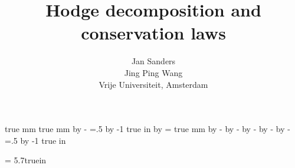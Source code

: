 \makeindex
\setcounter{secnumdepth}{7}
\setcounter{tocdepth}{7}



%
\newdimen\printercorrection
{} true mm
 true mm %
\advance\oddsidemargin by -\textwidth
\oddsidemargin=.5\oddsidemargin
\advance\oddsidemargin by -1 true in
\advance\oddsidemargin by \printercorrection
\evensidemargin=\oddsidemargin
{} true mm %
\advance\topmargin by -\textheight
\advance\topmargin by -\headheight
\advance\topmargin by -\headsep
\advance\topmargin by -\footheight
\advance\topmargin by -\footskip
\topmargin=.5\topmargin
\advance\topmargin by -1 true in
\newcommand{\lied}{\mbox{\eufm d}}
\newcommand{\lieg}{\mbox{\eufm g}}
\newcommand{\lief}{\mbox{\eufm f}}
\newcommand{\lieh}{\mbox{\eufm h}}
\newcommand{\lier}{\mbox{\eufm r}}
\newcommand{\lien}{\mbox{\eufm n}}
\newcommand{\R}{\mbox{\Bbb R}}
\newcommand{\liegl}{\mbox{\eufm gl}}
\def\operatorname#1{\mathop{\fam0 #1}\nolimits}
\def\Der{\operatorname{Der}}
\def\End{\operatorname{End}}
\def\Hom{\operatorname{Hom}}
\def\ad{\operatorname{ad}}
\def\im{\operatorname{Im}}
\def\ker{\operatorname{Ker}}
\def\id{\operatorname{Id}}
\def\d{\operatorname{d}}
\def\sym{\operatorname{Sym}}
\def\Cov{\operatorname{Cov}}
\def\Tr{\operatorname{Tr}}
\def\Str{\operatorname{Str}}
\def\Wedge{\hbox{\large$\wedge$}}
\def\cY{{{\cal Y}}}
\def\cT{{{\cal T}}}
\def\cZ{{{\cal Z}}}
\def\cL{{{\cal L}}}
\def\cC{{{\cal C}}}
\def\cD{{{\cal D}}}
\def\cS{{{\cal S}}}
\def\cCD{{{\cal C}\!D}}
\def\Yp{{\cal Y}^{{\it pol}}}
\def\hYp{\hat{\cY}^{\it pol}}
\def\boldsymbol#1{#1}
\newtheorem{Algorithm}{Algorithm}
\newtheorem{Proposition}{Proposition}
\newtheorem{Remark}{Remark}
\hsize =  5.7truein


\title{
Hodge decomposition and conservation laws}
\author{
Jan Sanders \\
Jing Ping Wang\\
Vrije Universiteit, Amsterdam\\
}
\maketitle
\tableofcontents
\newpage
\pagestyle{myheadings}
\newtheorem{Definition}{Definition}

